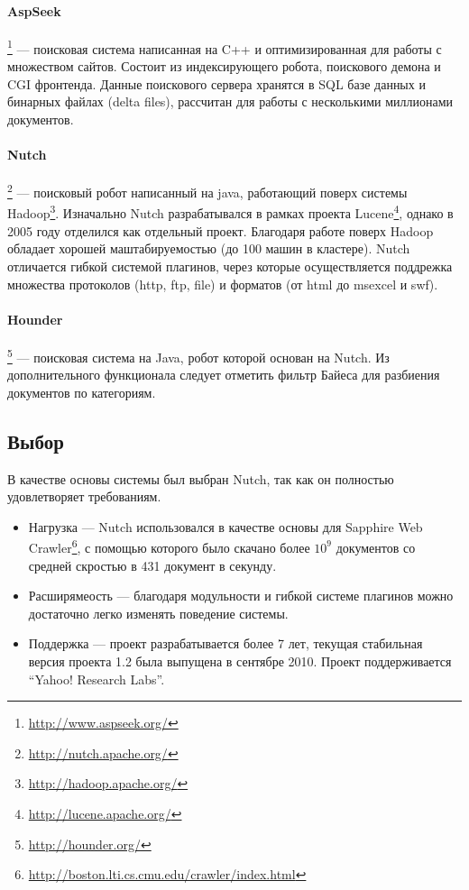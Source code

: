 \paragraph{AspSeek}\footnote{\href{http://www.aspseek.org/}{http://www.aspseek.org/}} --- поисковая система написанная на C++ и оптимизированная для работы с множеством сайтов. Состоит из индексирующего робота, поискового демона и CGI фронтенда. Данные поискового сервера хранятся в SQL базе данных и бинарных файлах (delta files), рассчитан для работы с несколькими миллионами документов.
\paragraph{Nutch}\footnote{\href{http://nutch.apache.org/}{http://nutch.apache.org/}} --- поисковый робот написанный на java, работающий поверх системы Hadoop\footnote{\href{http://hadoop.apache.org/}{http://hadoop.apache.org/}}. Изначально Nutch разрабатывался в рамках проекта Lucene\footnote{\href{http://lucene.apache.org/}{http://lucene.apache.org/}}, однако в 2005 году отделился как отдельный проект. Благодаря работе поверх Hadoop обладает хорошей маштабируемостью (до 100 машин в кластере). Nutch отличается гибкой системой плагинов, через которые осуществляется поддрежка множества протоколов (http, ftp, file) и форматов (от html до msexcel и swf).
\paragraph{Hounder}\footnote{\href{http://hounder.org/}{http://hounder.org/}} --- поисковая система на Java, робот которой основан на Nutch. Из дополнительного функционала следует отметить фильтр Байеса для разбиения документов по категориям.

\subsection{Выбор}
В качестве основы системы был выбран Nutch, так как он полностью удовлетворяет требованиям.
\begin{itemize}
 \item Нагрузка --- Nutch использовался в качестве основы для Sapphire Web Crawler\footnote{\href{http://boston.lti.cs.cmu.edu/crawler/index.html}{http://boston.lti.cs.cmu.edu/crawler/index.html}}, с помощью которого было скачано более $10^{9}$ документов со средней скростью в 431 документ в секунду.
 \item Расширямеость --- благодаря модульности и гибкой системе плагинов можно достаточно легко изменять поведение системы.
 \item Поддержка --- проект разрабатывается более 7 лет, текущая стабильная версия проекта 1.2 была выпущена в сентябре 2010. Проект поддерживается ``Yahoo! Research Labs''.
\end{itemize}

